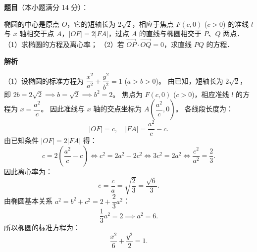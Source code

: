 \begin{answer}

\textbf{题目}（本小题满分 14 分）：

椭圆的中心是原点 $O$，它的短轴长为 $2\sqrt{2}$，相应于焦点 $F(c, 0)$ ($c > 0$) 的准线 $l$ 与 $x$ 轴相交于点 $A$，$|OF| = 2|FA|$，过点 $A$ 的直线与椭圆相交于 $P$、$Q$ 两点．
（1）求椭圆的方程及离心率；
（2）若 $\vec{OP} \cdot \vec{OQ} = 0$，求直线 $PQ$ 的方程．

\textbf{解析}

（1）设椭圆的标准方程为 $\dfrac{x^2}{a^2} + \dfrac{y^2}{b^2} = 1$ ($a > b > 0$)。
由已知，短轴长为 $2\sqrt{2}$，即 $2b = 2\sqrt{2} \implies b = \sqrt{2} \implies b^2 = 2$。
焦点为 $F(c, 0)$ ($c > 0$)，相应准线 $l$ 的方程为 $x = \dfrac{a^2}{c}$。
因此准线与 $x$ 轴的交点坐标为 $A\left(\dfrac{a^2}{c}, 0\right)$。
各线段长度为：
\nopagebreak[4]
\[
|OF| = c, \quad |FA| = \dfrac{a^2}{c} - c.
\]
由已知条件 $|OF| = 2|FA|$ 得：
\nopagebreak[4]
\[
c = 2\left(\dfrac{a^2}{c} - c\right) \iff c^2 = 2a^2 - 2c^2 \iff 3c^2 = 2a^2 \iff \dfrac{c^2}{a^2} = \dfrac{2}{3}.
\]
因此离心率为：
\nopagebreak[4]
\[
e = \dfrac{c}{a} = \sqrt{\dfrac{2}{3}} = \dfrac{\sqrt{6}}{3}.
\]
由椭圆基本关系 $a^2 = b^2 + c^2 = 2 + \dfrac{2}{3}a^2$：
\nopagebreak[4]
\[
\dfrac{1}{3}a^2 = 2 \implies a^2 = 6.
\]
所以椭圆的标准方程为：
\nopagebreak[4]
\[
\dfrac{x^2}{6} + \dfrac{y^2}{2} = 1.
\]


\end{answer}
